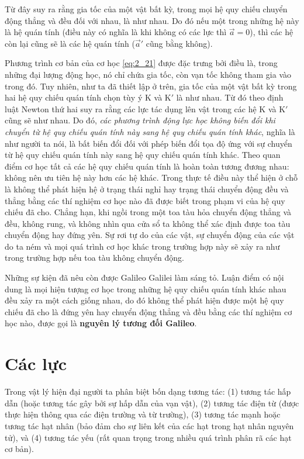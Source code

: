 \noindent
Từ đây suy ra rằng gia tốc của một vật bất kỳ, trong mọi hệ quy chiếu chuyển động thẳng và đều đối với nhau, là như nhau. Do đó nếu một trong những hệ này là hệ quán tính (điều này có nghĩa là khi không có các lực thì $\vec{a}=0$), thì các hệ còn lại cũng sẽ là các hệ quán tính ($\vec{a}'$ cũng bằng không).

Phương trình cơ bản của cơ học \eqref{eq:2_21} được đặc trưng bởi điều là, trong những đại lượng động học, nó chỉ chứa gia tốc, còn vạn tốc không tham gia vào trong đó. Tuy nhiên, như ta đã thiết lập ở trên, gia tốc của một vật bất kỳ trong hai hệ quy chiếu quán tính chọn tùy ý K và K$'$ là như nhau. Từ đó theo định luật Newton thứ hai suy ra rằng các lực tác dụng lên vật trong các hệ K và K$'$ cũng sẽ như nhau. Do đó, \textit{các phương trình động lực học không biến đổi khi chuyển từ hệ quy chiếu quán tính này sang hệ quy chiếu quán tính khác}, nghĩa là như người ta nói, là bất biến đổi đối với phép biến đổi tọa độ ứng với sự chuyển từ hệ quy chiếu quán tính này sang hệ quy chiếu quán tính khác. Theo quan điểm cơ học tất cả các hệ quy chiếu quán tính là hoàn toàn tương đương nhau: không nên ưu tiên hệ này hơn các hệ khác. Trong thực tế điều này thể hiện ở chỗ là không thể phát hiện hệ ở trạng thái nghỉ hay trạng thái chuyển động đều và thẳng bằng các thí nghiệm cơ học nào đã được biết trong phạm vi của hệ quy chiếu đã cho. Chẳng hạn, khi ngồi trong một toa tàu hỏa chuyển động thẳng và đều, không rung, và không nhìn qua cửa sổ ta không thể xác định được toa tàu chuyển động hay đứng yên. Sự rơi tự do của các vật, sự chuyển động của các vật do ta ném và mọi quá trình cơ học khác trong trường hợp này sẽ xảy ra như trong trường hợp nếu toa tàu không chuyển động.

Những sự kiện đã nêu còn được Galileo Galilei làm sáng tỏ. Luận điểm có nội dung là mọi hiện tượng cơ học trong những hệ quy chiếu quán tính khác nhau đều xảy ra một cách giống nhau, do đó không thể phát hiện được một hệ quy chiếu đã cho là đứng yên hay chuyển động thẳng và đều bằng các thí nghiệm cơ học nào, được gọi là \textbf{nguyên lý tương đối Galileo}.

\section{Các lực}\label{sec:2_8}

Trong vật lý hiện đại người ta phân biệt bốn dạng tương tác: (1) tương tác hấp dẫn (hoặc tương tác gây bởi sự hấp dẫn của vạn vật), (2) tương tác điện từ (được thực hiện thông qua các điện trường và từ trường), (3) tương tác mạnh hoặc tương tác hạt nhân (bảo đảm cho sự liên kết của các hạt trong hạt nhân nguyên tử), và (4) tương tác yếu (rất quan trọng trong nhiều quá trình phân rã các hạt cơ bản).

